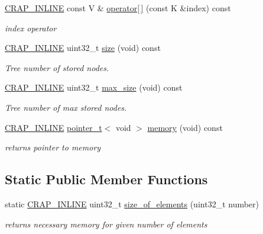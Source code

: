 \begin{DoxyCompactItemize}
\hyperlink{config__x86_8h_a5a40526b8d842e7ff731509998bb0f1c}{C\+R\+A\+P\+\_\+\+I\+N\+L\+I\+N\+E} const V \& \hyperlink{classcrap_1_1tree__map_a07a5165b7daf95b8e84d3c6d8f1a5c02}{operator\mbox{[}$\,$\mbox{]}} (const K \&index) const 
\begin{DoxyCompactList}\small\item\em index operator \end{DoxyCompactList}\item 
\hyperlink{config__x86_8h_a5a40526b8d842e7ff731509998bb0f1c}{C\+R\+A\+P\+\_\+\+I\+N\+L\+I\+N\+E} uint32\+\_\+t \hyperlink{classcrap_1_1tree__map_a8f64f41ca15631a937cbca9c8e6fdcec}{size} (void) const 
\begin{DoxyCompactList}\small\item\em Tree number of stored nodes. \end{DoxyCompactList}\item 
\hyperlink{config__x86_8h_a5a40526b8d842e7ff731509998bb0f1c}{C\+R\+A\+P\+\_\+\+I\+N\+L\+I\+N\+E} uint32\+\_\+t \hyperlink{classcrap_1_1tree__map_a94af2fa29c262d2d686d2716ad89e2bf}{max\+\_\+size} (void) const 
\begin{DoxyCompactList}\small\item\em Tree number of max stored nodes. \end{DoxyCompactList}\item 
\hyperlink{config__x86_8h_a5a40526b8d842e7ff731509998bb0f1c}{C\+R\+A\+P\+\_\+\+I\+N\+L\+I\+N\+E} \hyperlink{structcrap_1_1pointer__t}{pointer\+\_\+t}$<$ void $>$ \hyperlink{classcrap_1_1tree__map_a478da4a9798b325ef27494a2c9a178f4}{memory} (void) const 
\begin{DoxyCompactList}\small\item\em returns pointer to memory \end{DoxyCompactList}\end{DoxyCompactItemize}
\subsection*{Static Public Member Functions}
\begin{DoxyCompactItemize}
\item 
static \hyperlink{config__x86_8h_a5a40526b8d842e7ff731509998bb0f1c}{C\+R\+A\+P\+\_\+\+I\+N\+L\+I\+N\+E} uint32\+\_\+t \hyperlink{classcrap_1_1tree__map_a3e4f7f3bc27339ca317f1753badc3ba7}{size\+\_\+of\+\_\+elements} (uint32\+\_\+t number)
\begin{DoxyCompactList}\small\item\em returns necessary memory for given number of elements \end{DoxyCompactList}\end{DoxyCompactItemize}
